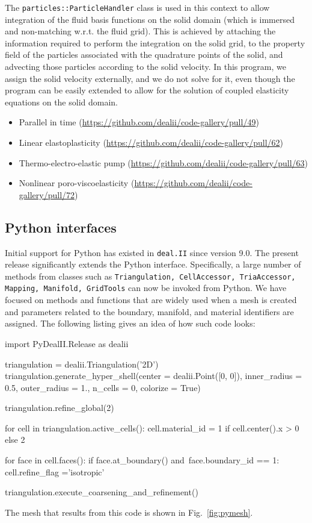 \documentclass{ansarticle-preprint}
\newcommand{\specialword}[1]{\texttt{#1}}
\newcommand{\dealii}{{\specialword{deal.II}}\xspace}
\begin{document}
\begin{itemize}
        The \texttt{particles::ParticleHandler} class is used in this context
        to allow integration of the fluid basis functions on the solid domain
        (which is immersed and non-matching w.r.t. the fluid grid). This is
        achieved by attaching the information required to perform the
        integration on the solid grid, to the property field of the particles
        associated with the quadrature points of the solid, and advecting those
        particles according to the solid velocity. In this program, we assign
        the solid velocity externally, and we do not solve for it, even though
        the program can be easily extended to allow for the solution of
        coupled elasticity equations on the solid domain.
\end{itemize}

\begin{itemize}
  \item Parallel in time (\url{https://github.com/dealii/code-gallery/pull/49})
  \item Linear elastoplasticity (\url{https://github.com/dealii/code-gallery/pull/62})
  \item Thermo-electro-elastic pump (\url{https://github.com/dealii/code-gallery/pull/63})
  \item Nonlinear poro-viscoelasticity (\url{https://github.com/dealii/code-gallery/pull/72})
\end{itemize}

\subsection{Python interfaces}
\label{subsec:python}

Initial support for Python has existed in \dealii{} since version
9.0. The present release significantly extends the Python
interface. Specifically, a large number of methods from classes such
as \texttt{Triangulation, CellAccessor, TriaAccessor, Mapping,
  Manifold, GridTools} can now be invoked from Python. We have focused
on methods and functions that are widely used when a mesh is created
and parameters related to the boundary, manifold, and material
identifiers are assigned. The following listing gives an idea of how
such code looks:
\begin{python}
  import PyDealII.Release as dealii

  triangulation = dealii.Triangulation('2D')
  triangulation.generate_hyper_shell(center = dealii.Point([0, 0]),
  inner_radius = 0.5, outer_radius = 1.,
  n_cells = 0, colorize = True)

  triangulation.refine_global(2)

  for cell in triangulation.active_cells():
  cell.material_id = 1 if cell.center().x > 0 else 2

  for face in cell.faces():
  if face.at_boundary() and\
  face.boundary_id == 1:
  cell.refine_flag ='isotropic'

  triangulation.execute_coarsening_and_refinement()
\end{python}
The mesh that results from this code is shown in Fig.~\ref{fig:pymesh}.
\end{document}
